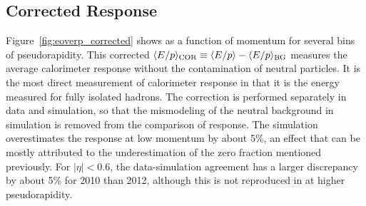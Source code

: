 \subsection{Corrected Response}
\label{sec:response}

Figure~\ref{fig:eoverp_corrected} shows \epcor as a function of momentum for several bins of pseudorapidity. 
This corrected $\langle E/p \rangle_{\mathrm{COR}} \equiv \langle E/p \rangle - \langle E/p \rangle_{\mathrm{BG}}$ measures the average calorimeter response without the contamination of neutral particles. 
It is the most direct measurement of calorimeter response in that it is the energy measured for fully isolated hadrons. 
The correction is performed separately in data and simulation, so that the mismodeling of the neutral background in simulation is removed from the comparison of response. 
The simulation overestimates the response at low momentum by about 5\%, an effect that can be mostly attributed to the underestimation of the zero fraction mentioned previously.
For $|\eta| < 0.6$, the data-simulation agreement has a larger discrepancy by about 5\% for 2010 than 2012, although this is not reproduced in at higher pseudorapidity. 

